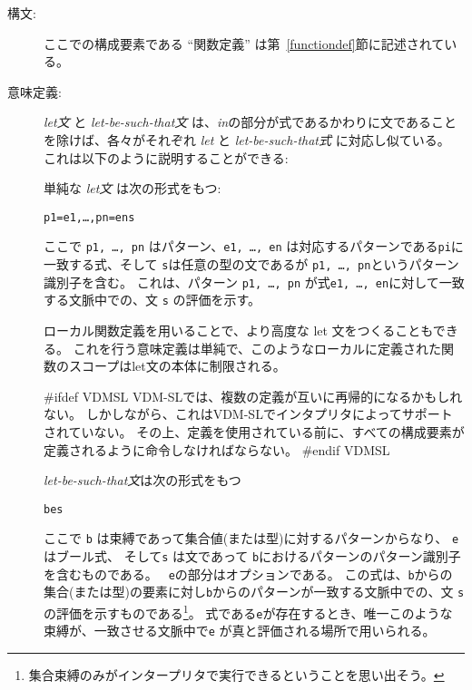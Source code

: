 \documentclass[\pformat,12pt]{jarticle}
\begin{document}
\begin{description}
\item[構文:]





 ここでの構成要素である ``関数定義'' は第~\ref{functiondef}節に記述されている。

\item[意味定義:]  {\it let文} と {\it let-be-such-that文} は、{\it in}の部分が式であるかわりに文であることを除けば、各々がそれぞれ {\it let} と {\it let-be-such-that式} に対応し似ている。
これは以下のように説明することができる:

  単純な {\it let文} は次の形式をもつ:
  \begin{alltt}
     p1 = e1, \ldots, pn = en  s
  \end{alltt}
ここで {\tt p1, \ldots, pn} はパターン、{\tt e1, \ldots, en} は対応するパターンである{\tt pi}に一致する式、そして {\tt s}は任意の型の文であるが {\tt  p1, \ldots, pn}というパターン識別子を含む。 
これは、パターン {\tt p1, \ldots, pn} が式{\tt e1, \ldots, en}に対して一致する文脈中での、文 {\tt s} の評価を示す。

ローカル関数定義を用いることで、より高度な let 文をつくることもできる。
これを行う意味定義は単純で、このようなローカルに定義された関数のスコープはlet文の本体に制限される。

#ifdef VDMSL
  VDM-SLでは、複数の定義が互いに再帰的になるかもしれない。
  しかしながら、これはVDM-SLでインタプリタによってサポートされていない。
  その上、定義を使用されている前に、すべての構成要素が定義されるように命令しなければならない。
#endif VDMSL

  {\it let-be-such-that文}は次の形式をもつ
  \begin{alltt}
     b  e  s
  \end{alltt}
ここで {\tt b} は束縛であって集合値(または型)に対するパターンからなり、 {\tt  e} はブール式、 そして{\tt s} は文であって {\tt b}におけるパターンのパターン識別子を含むものである。 
 {\tt {} e}の部分はオプションである。
この式は、{\tt b}からの集合(または型)の要素に対し{\tt b}からのパターンが一致する文脈中での、文 {\tt s} の評価を示すものである\footnote{集合束縛のみがインタープリタで実行できるということを思い出そう。}。 
 式である{\tt e}が存在するとき、唯一このような束縛が、一致させる文脈中で{\tt e} が真と評価される場所で用いられる。
     

\end{description}
\end{document}
